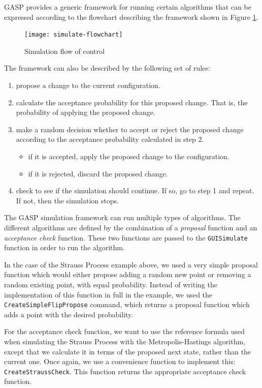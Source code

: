 GASP provides a generic framework for running certain algorithms that
can be expressed according to the flowchart describing the framework
shown in Figure \ref{fig:flowchart}.

\begin{figure}[hbtp]
\centering
\texttt{[image: simulate-flowchart]}
\caption{Simulation flow of control}
\label{fig:flowchart}
\end{figure}

The framework can also be described by the following set of rules:

\begin{enumerate}
\item propose a change to the current configuration.
\item calculate the acceptance probability for this proposed change.
That is, the probability of applying the proposed change.
\item make a random decision whether to accept or reject the proposed
change according to the acceptance probability calculated in step 2.
\begin{itemize}
\item if it is accepted, apply the proposed change to the configuration.
\item if it is rejected, discard the proposed change.
\end{itemize}
\item check to see if the simulation should continue.  If so, go to
step 1 and repeat.  If not, then the simulation stops.
\end{enumerate}

The GASP simulation framework can run multiple types of algorithms.
The different algorithms are defined by the combination of a
\emph{proposal} function and an \emph{acceptance check} function.
These two functions are passed to the \texttt{GUISimulate} function in
order to run the algorithm.

In the case of the Strauss Process example above, we used a very
simple proposal function which would either propose adding a random
new point or removing a random existing point, with equal probability.
Instead of writing the implementation of this function in full in the
example, we used the \texttt{CreateSimpleFlipPropose} command, which
returns a proposal function which adds a point with the desired
probability.

For the acceptance check function, we want to use the reference
formula used when simulating the Strauss Process with the
Metropolis-Hastings algorithm, except that we calculate it in terms of
the proposed next state, rather than the current one.  Once again, we
use a convenience function to implement this:
\texttt{CreateStraussCheck}.  This function returns the appropriate
acceptance check function.


